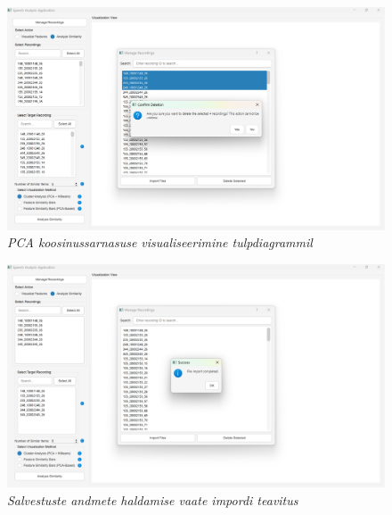 \begin{figure}[ht]
    \centering
    \includegraphics[width=\textwidth]{figures/rakenduse-teavitus-confirm.png}
    \caption{\textit{PCA koosinussarnasuse visualiseerimine tulpdiagrammil}}
    \label{fig:rakenduse-teavitus-confirm}
\end{figure}

\begin{figure}[ht]
    \centering
    \includegraphics[width=\textwidth]{figures/rakenduse-teavitus-import-complete.png}
    \caption{\textit{Salvestuste andmete haldamise vaate impordi teavitus}}
    \label{fig:rakenduse-teavitus-confirm}
\end{figure}


